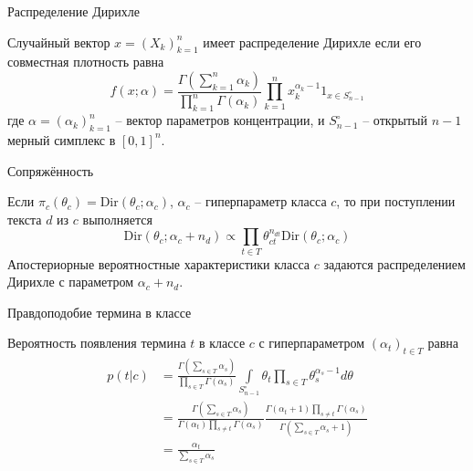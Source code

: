 \documentclass{beamer}
\newcommand{\clo}[1]{\left [ #1 \right ]}
\newcommand{\brac}[1]{\left ( #1 \right )}
\newcommand{\induc}[1]{\left . #1 \right \vert}
\begin{document}
\begin{frame}
  \begin{block}{Распределение Дирихле}

    Случайный вектор $x=\brac{X_k}_{k=1}^n$ имеет распределение Дирихле если его совместная плотность равна
    \[f\brac{x;\alpha} = \frac{\Gamma\brac{\sum_{k=1}^n\alpha_k}}{\prod_{k=1}^n \Gamma(\alpha_k)} \prod_{k=1}^n x_k^{\alpha_k-1} 1_{x\in S_{n-1}^\circ}\]
    где $\alpha = \brac{\alpha_k}_{k=1}^n$ -- вектор параметров концентрации, и $S_{n-1}^\circ$ -- открытый $n-1$ мерный симплекс в $\clo{0,1}^n$.
  \end{block}
  \begin{block}{Сопряжённость}

    Если $\pi_c(\theta_c) = \text{Dir}\brac{\theta_c;\alpha_c}$, $\alpha_c$ -- гиперпараметр класса $c$, то при поступлении текста $d$ из $c$ выполняется
    \[\text{Dir}\brac{\theta_c; \alpha_c+n_d} \propto \prod_{t\in T}\theta_{ct}^{n_{dt}} \text{Dir}\brac{\theta_c; \alpha_c}\]
    Апостериорные вероятностные характеристики класса $c$ задаются распределением Дирихле с параметром $\alpha_c + n_d$.
  \end{block}
\end{frame}

\begin{frame}
  \begin{block}{Правдоподобие термина в классе}

    Вероятность появления термина $t$ в классе $c$ с гиперпараметром $\brac{\alpha_t}_{t\in T}$ равна
    \begin{align*}
      p\brac{\induc{t} c} &= \frac{\Gamma\brac{\sum_{s\in T}\alpha_s}}{\prod_{s\in T} \Gamma(\alpha_s)} \int\limits_{S_{n-1}^\circ} \theta_t \prod_{s\in T} \theta_s^{\alpha_s-1} d\theta \\
      &= \frac{\Gamma\brac{\sum_{s\in T}\alpha_s}}{\Gamma(\alpha_t) \prod_{s\neq t} \Gamma(\alpha_s)} \frac{\Gamma(\alpha_t+1) \prod_{s\neq t} \Gamma(\alpha_s)}{\Gamma\brac{\sum_{s\in T}\alpha_s + 1}}\\
      &= \frac{\alpha_t}{\sum_{s\in T}\alpha_s}\\
    \end{align*}
  \end{block}
\end{frame}
\end{document}
